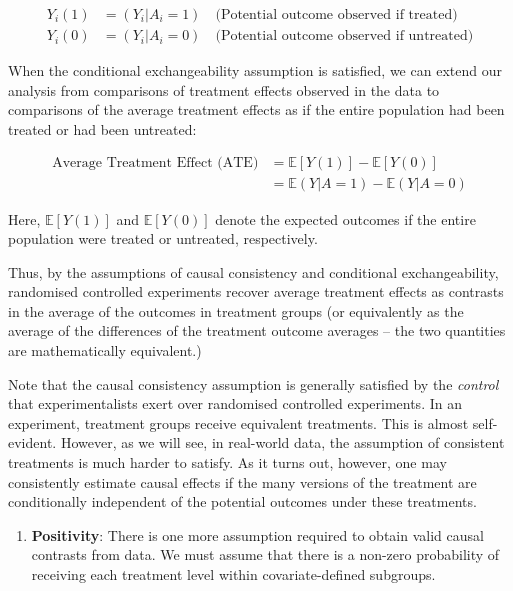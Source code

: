 \documentclass[
  singlecolumn]{article}
\providecommand{\tightlist}{%
  \setlength{\itemsep}{0pt}\setlength{\parskip}{0pt}}\usepackage{longtable,booktabs,array}
\begin{document}
\[
\begin{aligned}
Y_{i}(1) &= (Y_{i}|A_{i} = 1) \quad \text{(Potential outcome observed if treated)} \\
Y_{i}(0) &= (Y_{i}|A_{i} = 0) \quad \text{(Potential outcome observed if untreated)}
\end{aligned}
\]

When the conditional exchangeability assumption is satisfied, we can
extend our analysis from comparisons of treatment effects observed in
the data to comparisons of the average treatment effects as if the
entire population had been treated or had been untreated:

\[
\begin{aligned}
\text{Average Treatment Effect (ATE)} &= \mathbb{E}[Y(1)] - \mathbb{E}[Y(0)] \\
&= \mathbb{E}(Y|A=1) - \mathbb{E}(Y|A=0)
\end{aligned}
\]

Here, \(\mathbb{E}[Y(1)]\) and \(\mathbb{E}[Y(0)]\) denote the expected
outcomes if the entire population were treated or untreated,
respectively.

Thus, by the assumptions of causal consistency and conditional
exchangeability, randomised controlled experiments recover average
treatment effects as contrasts in the average of the outcomes in
treatment groups (or equivalently as the average of the differences of
the treatment outcome averages -- the two quantities are mathematically
equivalent.)

Note that the causal consistency assumption is generally satisfied by
the \emph{control} that experimentalists exert over randomised
controlled experiments. In an experiment, treatment groups receive
equivalent treatments. This is almost self-evident. However, as we will
see, in real-world data, the assumption of consistent treatments is much
harder to satisfy. As it turns out, however, one may consistently
estimate causal effects if the many versions of the treatment are
conditionally independent of the potential outcomes under these
treatments.

\begin{enumerate}
\def\labelenumi{\arabic{enumi}.}
\setcounter{enumi}{2}
\tightlist
\item
  \textbf{Positivity}: There is one more assumption required to obtain
  valid causal contrasts from data. We must assume that there is a
  non-zero probability of receiving each treatment level within
  covariate-defined subgroups.
\end{enumerate}
\end{document}
